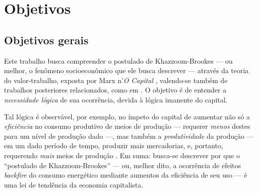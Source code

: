 




\chapter{Objetivos}
\label{cap:objetivos}
\section{Objetivos gerais}
Este trabalho busca compreender o postulado de Khazzoom-Brookes --- ou melhor, o fenômeno socioeconômico que ele busca descrever --- através da teoria do valor-trabalho, exposta por Marx n'\textit{O Capital} \citeyear{Marx2017, Marx2014, Marx2017a}, valendo-se também de trabalhos posteriores relacionados, como em \textcite{SaBarreto2018}. O objetivo é de entender a \textit{necessidade lógica} de sua ocorrência, devida à lógica imanente do capital. 

Tal lógica é observável, por exemplo, no ímpeto do capital de aumentar não só a \textit{eficiência} no consumo produtivo de meios de produção --- requerer \textit{menos} destes para um nível de produção dado ---, mas também a \textit{produtividade} da produção --- em um dado período de tempo, produzir mais mercadorias, e, portanto, requerendo \textit{mais} meios de produção \parencite{SaBarreto2021a,SaBarreto2022}. Em suma: busca-se descrever por que o ``postulado de Khazzoom-Brookes'' --- ou, melhor dito, a ocorrência de efeitos \textit{backfire} do consumo energético mediante aumentos da eficiência de seu uso --- é uma lei de tendência \parencite{Medeiros2013,Lawson1997,Bhaskar1978,Bhaskar1998} da economia capitalista.


